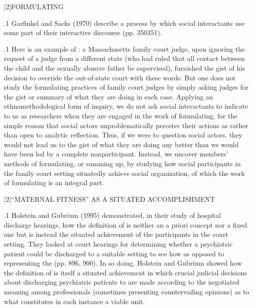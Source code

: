 \documentclass[11pt, twoside]{article}
\begin{document}
{\s|2|{FORMULATING}

\p.1{%
Garfinkel and Sacks (1970) describe a process by which social interactants use some part of their interactive discourse  (pp. 350\ndash{}351).
}%

\p.1{%
Here is an example of : a Massachusetts family court
judge, upon ignoring the request of a judge from a different state (who
had ruled that all contact between the child and the sexually abusive
father be supervised), furnished the gist of his decision to override the
out-of-state court with these words: 
But one does not study the formulating practices of family court
judges by simply asking judges for the gist or summary of what they
are doing in each case. Applying an ethnomethodological form of
inquiry, we do not ask social interactants to indicate to us as researchers when they are engaged in the work of formulating, for the
simple reason that social actors unproblematically perceive their actions as  rather than open to analytic reflection.
Thus, if we were to question social actors, they would not lead us
to the gist of what they are doing any better than we would have
been led by a complete nonparticipant. Instead, we uncover members’ methods of formulating, or summing up, by studying how social participants in the family court setting situatedly achieve social organization, of which the work of formulating is an integral
part.
}%


\s|2|{``MATERNAL FITNESS'' AS A SITUATED ACCOMPLISHMENT}

\p.1{%
Holstein and Gubrium (1995) demonstrated, in their study of hospital discharge hearings, how the definition of  is neither an a
priori concept nor a fixed one but is instead the situated achievement
of the participants in the court setting. They looked at court hearings
for determining whether a psychiatric patient could be discharged to a
suitable setting to see how  as opposed to representing the  (pp. 896, 900). In so doing, Holstein
and Gubrium showed how the definition of  is itself a situated achievement in which crucial judicial decisions about discharging
psychiatric patients to  are made according to the negotiated
meaning among professionals (sometimes presenting countervailing
opinions) as to what constitutes in each instance a viable  unit.
}%

}
\end{document}
